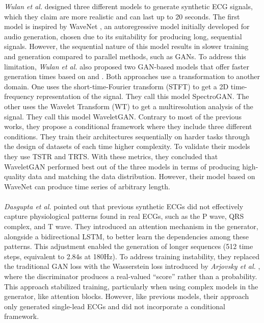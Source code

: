 \textit{Wulan et al.} \cite{wulanGeneratingElectrocardiogramSignals2020} designed three different models to generate synthetic ECG signals, which they claim are more realistic and can last up to 20 seconds. The first model is inspired by WaveNet \cite{oordWaveNetGenerativeModel2016}, an autoregressive model initially developed for audio generation, chosen due to its suitability for producing long, sequential signals. However, the sequential nature of this model results in slower training and generation compared to parallel methods, such as GANs. To address this limitation, \textit{Wulan et al.} also proposed two GAN-based models that offer faster generation times based on \cite{radfordUnsupervisedRepresentationLearning2016} and \cite{gulrajaniImprovedTrainingWasserstein2017}. Both approaches use a transformation to another domain. One uses the short-time-Fourier transform (STFT) to get a 2D time-frequency representation of the signal. They call this model SpectroGAN. The other uses the Wavelet Transform (WT) to get a multiresolution analysis of the signal. They call this model WaveletGAN. Contrary to most of the previous works, they propose a conditional framework where they include three different conditions. They train their architectures sequentially on harder tasks through the design of datasets of each time higher complexity. To validate their models they use TSTR and TRTS. With these metrics, they concluded that WaveletGAN performed best out of the three models in terms of producing high-quality data and matching the data distribution. However, their model based on WaveNet can produce time series of arbitrary length.
\\ \\
\textit{Dasgupta et al.} \cite{dasguptaCardioGANAttentionbasedGenerative2021} pointed out that previous synthetic ECGs did not effectively capture physiological patterns found in real ECGs, such as the P wave, QRS complex, and T wave. They introduced an attention mechanism in the generator, alongside a bidirectional LSTM, to better learn the dependencies among these patterns. This adjustment enabled the generation of longer sequences (512 time steps, equivalent to 2.84s at 180Hz). To address training instability, they replaced the traditional GAN loss \cite{goodfellowGenerativeAdversarialNetworks2014} with the Wasserstein loss introduced by \textit{Arjovsky et al.} \cite{arjovskyWassersteinGAN2017}, where the discriminator produces a real-valued “score” rather than a probability. This approach stabilized training, particularly when using complex models in the generator, like attention blocks. However, like previous models, their approach only generated single-lead ECGs and did not incorporate a conditional framework.

